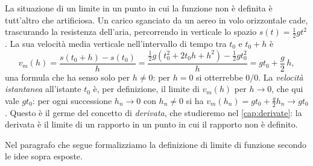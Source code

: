 \begin{idea}
La situazione di un limite in un punto in cui la funzione non è definita è tutt'altro che
artificiosa. Un carico sganciato da un aereo in volo orizzontale cade, trascurando la
resistenza dell'aria, percorrendo in verticale lo spazio $s(t)=\frac12gt^{2}$. La sua
velocità media verticale nell'intervallo di tempo tra $t_{0}$ e $t_{0}+h$ è
\[
  v_{m}(h)=\frac{s(t_{0}+h)-s(t_{0})}{h}=\frac{\frac12g(t_{0}^{2}+2t_{0}h+h^{2})-\frac12gt_{0}^{2}}{h}
  =gt_{0}+\frac g2\,h ,
\]
una formula che ha senso solo per $h\neq0$: per $h=0$ si otterrebbe $0/0$. La
\emph{velocità istantanea} all'istante $t_{0}$ è, per definizione, il limite di
$v_{m}(h)$ per $h\to0$, che qui vale $gt_{0}$: per ogni successione $h_{n}\to0$ con
$h_{n}\neq0$ si ha $v_{m}(h_{n})=gt_{0}+\frac g2h_{n}\to gt_{0}$. Questo è il germe del
concetto di \emph{derivata}, che studieremo nel \cref{cap:derivate}: la derivata è il
limite di un rapporto in un punto in cui il rapporto non è definito.
\end{idea}

Nel paragrafo che segue formalizziamo la definizione di limite di funzione secondo le
idee sopra esposte.

